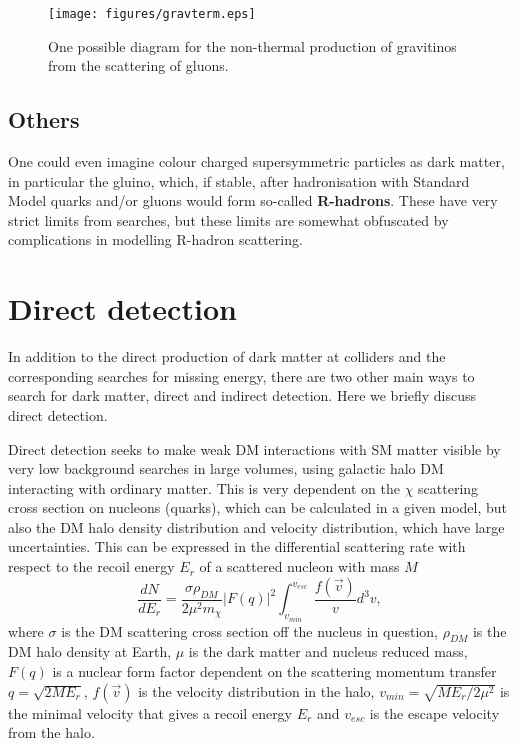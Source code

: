 \documentclass[notes.tex]{subfiles}
\begin{document}
\begin{figure}[h!]
\begin{center}
\texttt{[image: figures/gravterm.eps]} 
\caption{One possible diagram for the non-thermal production of gravitinos from the scattering of gluons.\label{gravterm}}
\end{center}
\end{figure}


\subsection{Others}
One could even imagine colour charged supersymmetric particles as dark matter, in particular the gluino, which, if stable, after hadronisation with Standard Model quarks and/or gluons would form so-called {\bf R-hadrons}. These have very strict limits from searches, but these limits are somewhat obfuscated by complications in modelling R-hadron scattering.



\section{Direct detection}
\label{sec:DD}
In addition to the direct production of dark matter at colliders and the corresponding searches for missing energy, there are two other main ways to search for dark matter, direct and indirect detection. Here we briefly discuss direct detection.

Direct detection seeks to make weak DM interactions with SM matter visible by very low background searches in large volumes, using galactic halo DM interacting with ordinary matter. This is very dependent on the $\chi$ scattering cross section on nucleons (quarks), which can be calculated in a given model, but also the DM halo density distribution and velocity distribution, which have large uncertainties. This can be expressed in the differential scattering rate with respect to the recoil energy $E_r$ of a scattered nucleon with mass $M$
\begin{equation}
\frac{dN}{dE_r} = \frac{\sigma \rho_{DM}}{2\mu^2 m_\chi}|F(q)|^2\int_{v_{min}}^{v_{esc}} \frac{f(\vec v)}{v}d^3v,
\end{equation}
where $\sigma$ is the DM scattering cross section off the nucleus in question, $\rho_{DM}$ is the DM halo density at Earth, $\mu$ is the dark matter and nucleus reduced mass, $F(q)$ is a nuclear form factor dependent on the scattering momentum transfer $q=\sqrt{2ME_r}$, $f(\vec v)$ is the velocity distribution in the halo, $v_{min}=\sqrt{ME_r/2\mu^2}$ is the minimal velocity that gives a recoil energy $E_r$ and $v_{esc}$ is the escape velocity from the halo.
\end{document}
